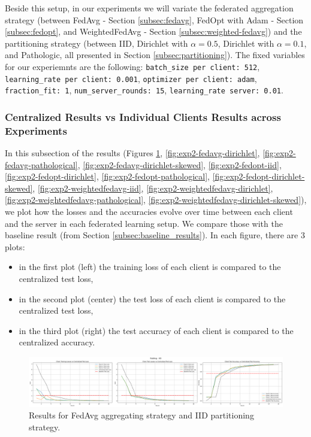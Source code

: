 \documentclass[11pt]{article}
\begin{document}
    Beside this setup, in our experiments we will variate the federated aggregation strategy (between FedAvg - Section \ref{subsec:fedavg}, FedOpt with Adam - Section \ref{subsec:fedopt}, and WeightedFedAvg - Section \ref{subsec:weighted-fedavg}) and the partitioning strategy (between IID, Dirichlet with $\alpha = 0.5$, Dirichlet with $\alpha = 0.1$, and Pathologic, all presented in Section \ref{subsec:partitioning}). The fixed variables for our experiemnts are the following: \texttt{batch\_size per client: 512}, \texttt{learning\_rate per client: 0.001}, \texttt{optimizer per client: adam}, \texttt{fraction\_fit: 1}, \texttt{num\_server\_rounds: 15}, \texttt{learning\_rate server: 0.01}.

    \subsubsection{Centralized Results vs Individual Clients Results across Experiments}
    In this subsection of the results (Figures \ref{fig:exp2-fedavg-iid}, \ref{fig:exp2-fedavg-dirichlet}, \ref{fig:exp2-fedavg-pathological}, \ref{fig:exp2-fedavg-dirichlet-skewed}, \ref{fig:exp2-fedopt-iid}, \ref{fig:exp2-fedopt-dirichlet}, \ref{fig:exp2-fedopt-pathological}, \ref{fig:exp2-fedopt-dirichlet-skewed}, \ref{fig:exp2-weightedfedavg-iid}, \ref{fig:exp2-weightedfedavg-dirichlet}, \ref{fig:exp2-weightedfedavg-pathological}, \ref{fig:exp2-weightedfedavg-dirichlet-skewed}), we plot how the losses and the accuracies evolve over time between each client and the server in each federated learning setup. We compare those with the baseline result (from Section \ref{subsec:baseline_results}). In each figure, there are 3 plots:
    \begin{itemize}
        \item in the first plot (left) the training loss of each client is compared to the centralized test loss,
        \item in the second plot (center) the test loss of each client is compared to the centralized test loss,
        \item in the third plot (right) the test accuracy of each client is compared to the centralized accuracy.
    \end{itemize}

    \begin{figure}[h!]
        \centering
        \includegraphics[width=1\linewidth]{img/experiment_2/fedavg-iid}
        \caption{Results for FedAvg aggregating strategy and IID partitioning strategy.}
        \label{fig:exp2-fedavg-iid}
    \end{figure}
\end{document}
